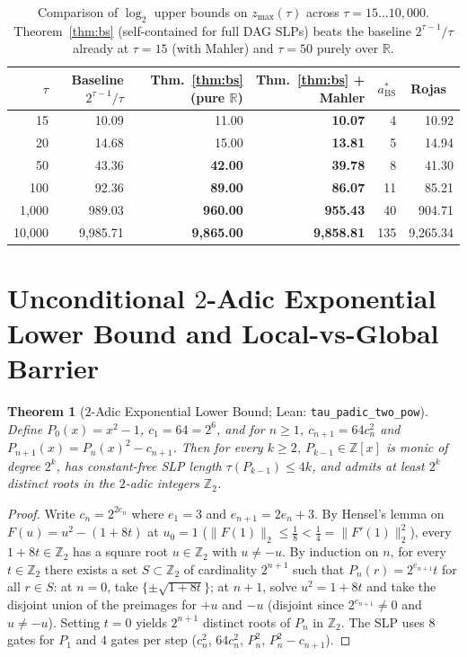 \documentclass[11pt]{article}
\newtheorem{theorem}{Theorem}[section]
\newcommand{\Z}{\mathbb{Z}}
\newcommand{\R}{\mathbb{R}}
\newcommand{\code}[1]{\texttt{#1}}
\newcommand{\zmax}{z_{\max}}
\begin{document}
\begin{table}[ht]
\centering
\small
\caption{Comparison of $\log_2$ upper bounds on $\zmax(\tau)$ across $\tau = 15 \dots 10{,}000$. Theorem~\ref{thm:bs} (self-contained for full DAG SLPs) beats the baseline $2^{\tau-1}/\tau$ already at $\tau = 15$ (with Mahler) and $\tau = 50$ purely over $\R$.}
\label{tab:upper}
\begin{tabular}{@{}rrrrrr@{}}
\toprule
$\tau$ & Baseline $2^{\tau-1}/\tau$ & Thm.~\ref{thm:bs} (pure $\R$) & Thm.~\ref{thm:bs} + Mahler & $a^*_{\mathrm{BS}}$ & Rojas~\cite{Rojas2002} \\
\midrule
15 & 10.09 & 11.00 & \textbf{10.07} & 4 & 10.92 \\
20 & 14.68 & 15.00 & \textbf{13.81} & 5 & 14.94 \\
50 & 43.36 & \textbf{42.00} & \textbf{39.78} & 8 & 41.30 \\
100 & 92.36 & \textbf{89.00} & \textbf{86.07} & 11 & 85.21 \\
1,000 & 989.03 & \textbf{960.00} & \textbf{955.43} & 40 & 904.71 \\
10,000 & 9,985.71 & \textbf{9,865.00} & \textbf{9,858.81} & 135 & 9,265.34 \\
\bottomrule
\end{tabular}
\end{table}

\section{Unconditional $2$-Adic Exponential Lower Bound and Local-vs-Global Barrier}\label{sec:padic}

\begin{theorem}[$2$-Adic Exponential Lower Bound; Lean: \code{tau\_padic\_two\_pow}]\label{thm:padic}
Define $P_0(x) = x^2 - 1$, $c_1 = 64 = 2^6$, and for $n \ge 1$, $c_{n+1} = 64 c_n^2$ and $P_{n+1}(x) = P_n(x)^2 - c_{n+1}$. Then for every $k \ge 2$, $P_{k-1} \in \Z[x]$ is monic of degree $2^k$, has constant-free SLP length $\tau(P_{k-1}) \le 4k$, and admits at least $2^k$ distinct roots in the $2$-adic integers $\Z_2$.
\end{theorem}

\begin{proof}
Write $c_n = 2^{2 e_n}$ where $e_1 = 3$ and $e_{n+1} = 2e_n + 3$. By Hensel's lemma on $F(u) = u^2 - (1 + 8t)$ at $u_0 = 1$ ($\|F(1)\|_2 \le \frac{1}{8} < \frac{1}{4} = \|F'(1)\|_2^2$), every $1 + 8t \in \Z_2$ has a square root $u \in \Z_2$ with $u \neq -u$. By induction on $n$, for every $t \in \Z_2$ there exists a set $S \subset \Z_2$ of cardinality $2^{n+1}$ such that $P_n(r) = 2^{e_{n+1}} t$ for all $r \in S$: at $n = 0$, take $\{\pm\sqrt{1+8t}\}$; at $n+1$, solve $u^2 = 1 + 8t$ and take the disjoint union of the preimages for $+u$ and $-u$ (disjoint since $2^{e_{n+1}} \neq 0$ and $u \neq -u$). Setting $t = 0$ yields $2^{n+1}$ distinct roots of $P_n$ in $\Z_2$. The SLP uses $8$ gates for $P_1$ and $4$ gates per step ($c_n^2$, $64 c_n^2$, $P_n^2$, $P_n^2 - c_{n+1}$).
\end{proof}
\end{document}
